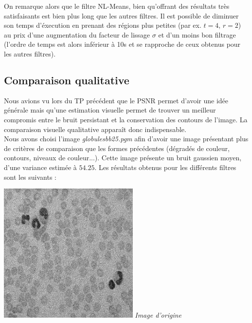 \documentclass[a4,12pt]{article}
\begin{document}
On remarque alors que le filtre NL-Means, bien qu'offrant des résultats très satisfaisants est bien plus long que les autres filtres. Il est possible de diminuer son temps d'éxecution en prenant des régions plus petites (par ex. $t=4$, $r=2$) au prix d'une augmentation du facteur de lissage $\sigma$ et d'un moins bon filtrage (l'ordre de temps est alors inférieur à 10s et se rapproche de ceux obtenus pour les autres filtres).


\vspace{2em}

\subsection{Comparaison qualitative}

Nous avions vu lors du TP précédent que le PSNR permet d'avoir une idée générale mais qu'une estimation visuelle permet de trouver un meilleur compromis entre le bruit persistant et la conservation des contours de l'image. La comparaison visuelle qualitative apparaît donc indispensable.\\

Nous avons choisi l'image \textit{globulesbb25.pgm} afin d'avoir une image présentant plus de critères de comparaison que les formes précédentes (dégradés de couleur, contours, niveaux de couleur...). Cette image présente un bruit gaussien moyen, d'une variance estimée à $54.25$. Les résultats obtenus pour les différents filtres sont les suivants :\\


\noindent
\begin{center}
	\begin{minipage}[c]{0.45\linewidth}
		\begin{center}
			\includegraphics[width = 70mm]{./img/globOrig.jpg}
			\textit{Image d'origine}
		\end{center}
	\end{minipage}
\end{center}
\end{document}
